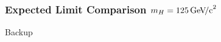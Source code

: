\documentclass{beamer}
\newcommand{\GeVcc}{\ensuremath{\,\mathrm{Ge\kern -0.1em V\!/c}^2}}
\newcommand{\tredbf}[1]{\textcolor{red}{\bf #1}}
\begin{document}
\begin{frame}
\frametitle{Expected Limit Comparison $m_H=125\GeVcc{}$}
\begin{center}
\end{center}
\end{frame}


\begin{frame}
  \begin{center}
    \Huge
    Backup
  \end{center}
\end{frame}

\end{document}
